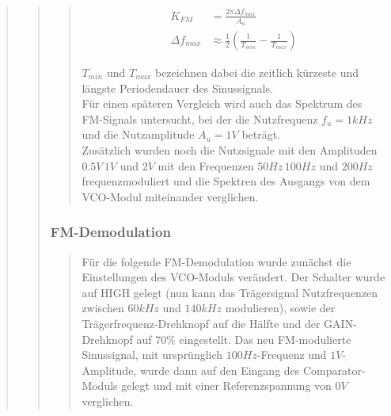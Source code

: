 \begin{quote}
\begin{quote}
\begin{quote}
        \begin{equation*}
    	\begin{split}
    		K_{FM} &= \frac{2 \pi \Delta f_{max}}{A_u}\\
			\Delta f_{max} &\approx \frac{1}{2} (\frac{1}{T_{min}} - \frac{1}{T_{max}})    		
    	\end{split}
    	\end{equation*}
    	
   		$T_{min}$ und $T_{max}$ bezeichnen dabei die zeitlich kürzeste und längste
   		Periodendauer des Sinussignals.\\
   		Für einen späteren Vergleich wird auch das Spektrum des FM-Signals
   		untersucht, bei der die Nutzfrequenz $f_u = 1 kHz$ und die Nutzamplitude
   		$A_u = 1 V$ beträgt.\\
   		Zusätzlich wurden noch die Nutzsignale mit den Amplituden $0.5 V\, 1 V$ und
   		$2 V$ mit den Frequenzen $50 Hz\, 100 Hz$ und $200 Hz$ frequenzmoduliert
   		und die Spektren des Ausgangs von dem VCO-Modul miteinander verglichen. 
        \end{quote}
        
        \subsubsection{FM-Demodulation}
        \begin{quote}
        Für die folgende FM-Demodulation wurde zunächst die Einstellungen des VCO-Moduls verändert. Der Schalter wurde
        auf HIGH gelegt (nun kann das Trägersignal Nutzfrequenzen zwischen $60 kHz$ und $140 kHz$ modulieren), sowie der
        Trägerfrequenz-Drehknopf auf die Hälfte und der GAIN-Drehknopf auf $70 \%$ eingestellt. Das neu FM-modulierte
        Sinussignal, mit ursprünglich $100 Hz$-Frequenz und $1 V$-Amplitude, wurde dann auf den Eingang des
        Comparator-Moduls gelegt und mit einer Referenzspannung von $0 V$ verglichen.\\
        

\end{quote}
\end{quote}
\end{quote}
